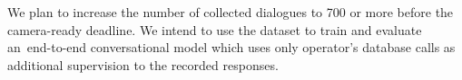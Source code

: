 \documentclass[runningheads,a4paper]{llncs}
\newcommand{\commentontext}[2]{\colorbox{yellow!60}{#1}\pdfcomment[color={0.234 0.867 0.211},hoffset=-6pt,voffset=10pt,opacity=0.5]{#2}}
\begin{document}
We plan to increase the number of collected dialogues to 700 or more before the camera-ready deadline.
We intend to use the dataset to train and evaluate an~end-to-end conversational model which uses only operator's database calls as additional supervision to the recorded responses. 


%
%
%
%
%
%


\vspace{-1.00em}



\end{document}
